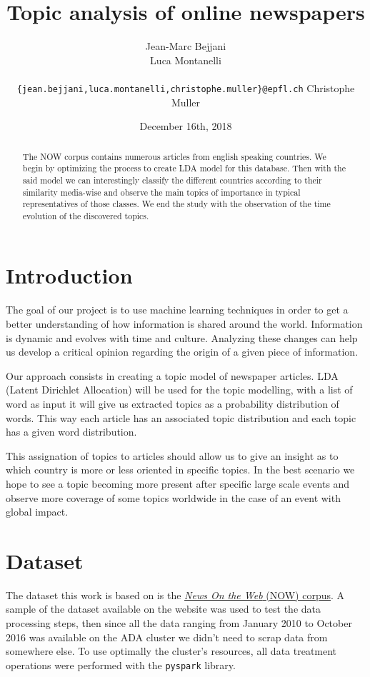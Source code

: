 \documentclass[11pt]{article}
\title{Topic analysis of online newspapers}
\author{
  Jean-Marc Bejjani \\
  \And
  Luca Montanelli \\\\
  {\tt \{jean.bejjani,luca.montanelli,christophe.muller\}@epfl.ch} 
  \And
  Christophe Muller \\
  }
\date{December 16th, 2018}
\newcommand{\code}[1]{\texttt{#1}}
\begin{document}
\maketitle

\begin{abstract}
The NOW corpus contains numerous articles from english speaking countries. We begin by optimizing the process to create LDA model for this database. Then with the said model we can interestingly classify the different countries according to their similarity media-wise and observe the main topics of importance in typical representatives of those classes. We end the study with the observation of the time evolution of the discovered topics.
\end{abstract}



\section{Introduction}
The goal of our project is to use machine learning techniques in order to get a better understanding of how information is shared around the world. Information is dynamic and evolves with time and culture. Analyzing these changes can help us develop a critical opinion regarding the origin of a given piece of information.

Our approach consists in creating a topic model of newspaper articles.
LDA (Latent Dirichlet Allocation) will be used for the topic modelling, with a list of word as input it will give us extracted topics as a probability distribution of words. This way each article has an associated topic distribution and each topic has a given word distribution. 

This assignation of topics to articles should allow us to give an insight as to which country is more or less oriented in specific topics. In the best scenario we hope to see a topic becoming more present after specific large scale events and observe more coverage of some topics worldwide in the case of an event with global impact.


\section{Dataset}
The dataset this work is based on is the \href{https://corpus.byu.edu/now/}{\textit{News On the Web} (NOW) corpus}.
A sample of the dataset available on the website was used to test the data processing steps, then since all the data ranging from January 2010 to October 2016 was available on the ADA cluster we didn't need to scrap data from somewhere else. To use optimally the cluster's resources, all data treatment operations were performed with the \code{pyspark} library.
\end{document}
